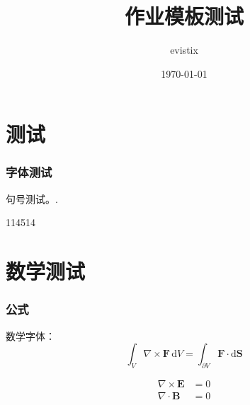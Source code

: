 \documentclass[theme = fancy, zihao = 5]{work-template}
\title{作业模板测试}
\author{evistix}
\date{\today}
\begin{document}
\maketitle

\part{测试}
\section{字体测试}
句号测试。.\par
114514

\part{数学测试}
\section{公式}
数学字体：
\begin{equation}
    \int_V \nabla\times \symbf F\,\mathrm{d}V = \int_{\partial V} \symbf F\cdot\mathrm{d}\symbf S 
\end{equation}

\begin{align}
    \nabla\times \symbf E &= 0 \\
    \nabla\cdot \symbf B &= 0
\end{align}
\end{document}
